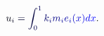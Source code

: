 \documentclass[12pt]{article}
\begin{document}
\makeatletter
\renewcommand*{\@textcolor}[3]{%
  \protect\leavevmode
  \begingroup
    \color#1{#2}#3%
  \endgroup
}
\makeatother
\begin{displaymath}
\mathcolor[RGB]{0,0,15}{u} _ { \mathcolor[RGB]{0,0,30}{i} } \mathcolor[RGB]{0,0,45}{=} \mathcolor[RGB]{0,0,60}{\int} _ { \mathcolor[RGB]{0,0,75}{0} } ^ { \mathcolor[RGB]{0,0,90}{1} } \mathcolor[RGB]{0,0,105}{k} _ { \mathcolor[RGB]{0,0,120}{i} } \mathcolor[RGB]{0,0,135}{m} _ { \mathcolor[RGB]{0,0,150}{i} } \mathcolor[RGB]{0,0,165}{e} _ { \mathcolor[RGB]{0,0,180}{i} } \mathcolor[RGB]{0,0,195}{(} \mathcolor[RGB]{0,0,210}{x} \mathcolor[RGB]{0,0,225}{)} \mathcolor[RGB]{0,0,240}{d} \mathcolor[RGB]{0,0,255}{x} \mathcolor[RGB]{0,15,0}{.}
\end{displaymath}
\end{document}
